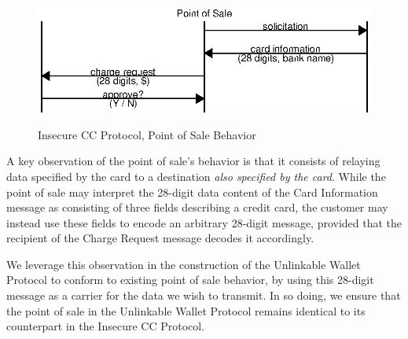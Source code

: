 \begin{figure}[h!]
  \caption{Insecure CC Protocol, Point of Sale Behavior}
  \centering
    \includegraphics{img/interface_pos.eps}
  \label{fig:interface_pos}
\end{figure}

A key observation of the point of sale's behavior is that it consists of relaying data
	specified by the card to a destination \emph{also specified by the card}.
While the point of sale may interpret the 28-digit data content of the Card Information message as consisting of three fields describing a credit card,
	the customer may instead use these fields to encode an arbitrary 28-digit message, provided that the recipient of the Charge Request message decodes it accordingly.

We leverage this observation in the construction of the Unlinkable Wallet Protocol to conform to existing point of sale behavior,
	by using this 28-digit message as a carrier for the data we wish to transmit.
In so doing, we ensure that the point of sale in the Unlinkable Wallet Protocol remains identical to its counterpart in the Insecure CC Protocol.
